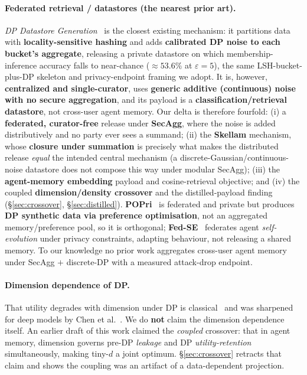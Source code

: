 \documentclass[pdflatex,sn-mathphys-num,iicol]{sn-jnl}
\theoremstyle{thmstyleone}%
\theoremstyle{thmstyletwo}%
\theoremstyle{thmstylethree}%
\newcommand{\eps}{\varepsilon}
\newcommand{\secref}[1]{\S\ref{#1}}
\begin{document}
\paragraph{Federated retrieval / datastores (the nearest prior art).}
\emph{DP Datastore Generation}~\cite{abouelenein2026dpdatastore} is the closest
existing mechanism: it partitions data with \textbf{locality-sensitive hashing}
and adds \textbf{calibrated DP noise to each bucket's aggregate}, releasing a
private datastore on which membership-inference accuracy falls to near-chance
($\approx 53.6\%$ at $\eps = 5$), the same LSH-bucket-plus-DP skeleton and
privacy-endpoint framing we adopt. It is, however, \textbf{centralized and
single-curator}, uses \textbf{generic additive (continuous) noise with no secure
aggregation}, and its payload is a \textbf{classification/retrieval datastore},
not cross-user agent memory. Our delta is therefore fourfold: (i) a
\textbf{federated, curator-free} release under \textbf{SecAgg}, where the noise is
added distributively and no party ever sees a summand; (ii) the \textbf{Skellam}
mechanism, whose \textbf{closure under summation} is precisely what makes the
distributed release \emph{equal} the intended central mechanism (a
discrete-Gaussian/continuous-noise datastore does not compose this way under
modular SecAgg); (iii) the \textbf{agent-memory embedding} payload and
cosine-retrieval objective; and (iv) the coupled \textbf{dimension/density
crossover} and the distilled-payload finding (\secref{sec:crossover},
\secref{sec:distilled}). \textbf{POPri}~\cite{hou2025popri} is federated and
private but produces \textbf{DP synthetic data via preference optimisation}, not
an aggregated memory/preference pool, so it is orthogonal;
\textbf{Fed-SE}~\cite{chen2025fedse} federates agent \emph{self-evolution} under
privacy constraints, adapting behaviour, not releasing a shared memory. To our
knowledge no prior work aggregates cross-user agent memory under SecAgg $+$
discrete-DP with a measured attack-drop endpoint.

\paragraph{Dimension dependence of DP.}
That utility degrades with dimension under DP is
classical~\cite{bassily2014erm} and was sharpened for deep models by Chen et
al.~\cite{chen2022price}. We do \textbf{not} claim the dimension dependence
itself. An earlier draft of this work claimed the \emph{coupled} crossover: that
in agent memory, dimension governs pre-DP \emph{leakage} and DP
\emph{utility-retention} simultaneously, making tiny-$d$ a joint optimum.
\secref{sec:crossover} retracts that claim and shows the coupling was an artifact
of a data-dependent projection.
\end{document}
